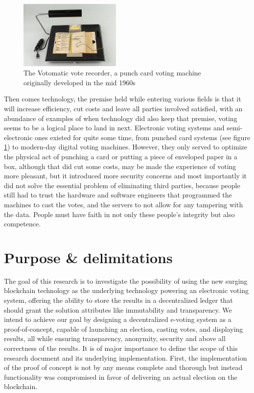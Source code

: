 \begin{figure}
	\vspace{-10pt}
	\includegraphics[width=5cm]{images/chapter1/votomatic.jpg}
	\vspace{-10pt}
	\caption{{\footnotesize The Votomatic vote recorder, a punch card voting machine originally developed in the mid 1960s}}
	\label{votomatic}
\end{figure}

Then comes technology, the premise held while entering various fields is that it will increase efficiency, cut costs and leave all parties involved satisfied, with an abundance of examples of when technology did also keep that premise, voting seems to be a logical place to land in next. Electronic voting systems and semi-electronic ones existed for quite some time, from punched card systems {\small (see figure \ref{votomatic})} to modern-day digital voting machines. However, they only served to optimize the physical act of punching a card or putting a piece of enveloped paper in a box, although that did cut some costs, may be made the experience of voting more pleasant, but it introduced more security concerns and most importantly it did not solve the essential problem of eliminating third parties, because people still had to trust the hardware and software engineers that programmed the machines to cast the votes, and the servers to not allow for any tampering with the data. People must have faith in not only these people’s integrity but also competence.\newpage


\section{Purpose \& delimitations}
The goal of this research is to investigate the possibility of using the new surging blockchain technology as the underlying technology powering an electronic voting system, offering the ability to store the results in a decentralized ledger that should grant the solution attributes like immutability and transparency. We intend to achieve our goal by designing a decentralized e-voting system as a proof-of-concept, capable of launching an election, casting votes, and displaying results, all while ensuring transparency, anonymity, security and above all correctness of the results.
It is of major importance to define the scope of this research document and its underlying implementation. First, the implementation of the proof of concept is not by any means complete and thorough but instead functionality was compromised in favor of delivering an actual election on the blockchain.

